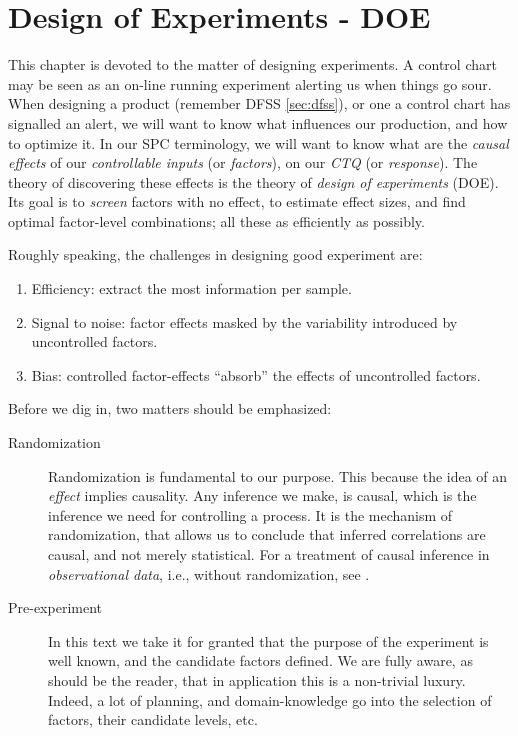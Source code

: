 \chapter[DOE]{Design of Experiments - DOE}

This chapter is devoted to the matter of designing experiments.
A control chart may be seen as an on-line running experiment alerting us when things go sour. 
When designing a product (remember DFSS \ref{sec:dfss}), or one a control chart has signalled an alert, we will want to know what influences our production, and how to optimize it.
In our SPC terminology, we will want to know what are the \emph{causal} \emph{effects} of our \emph{controllable inputs} (or \emph{factors}), on our \emph{CTQ} (or \emph{response}). 
The theory of discovering these effects is the theory of \emph{design of experiments} (DOE).
Its goal is to \emph{screen} factors with no effect, to estimate effect sizes, and find optimal factor-level combinations; all these as efficiently as possibly.


Roughly speaking, the challenges in designing good experiment are:
\begin{enumerate}
\item Efficiency: extract the most information per sample.
\item Signal to noise: factor effects masked by the variability introduced by uncontrolled factors.
\item Bias: controlled factor-effects ``absorb'' the effects of uncontrolled factors.
\end{enumerate}





Before we dig in, two matters should be emphasized:
\begin{description}
\item [Randomization] Randomization is fundamental to our purpose. This because the idea of an \emph{effect} implies causality. Any inference we make, is causal, which is the inference we need for controlling a process.
It is the mechanism of randomization, that allows us to conclude that inferred correlations are causal, and not merely statistical.
For a treatment of causal inference in \emph{observational data}, i.e., without randomization, see \cite{rosenbaum_observational_2002}.

\item [Pre-experiment] In this text we take it for granted that the purpose of the experiment is well known, and the candidate factors defined. We are fully aware, as should be the reader, that in application this is a non-trivial luxury. Indeed, a lot of planning, and domain-knowledge go into the selection of factors, their candidate levels, etc.

\end{description}



